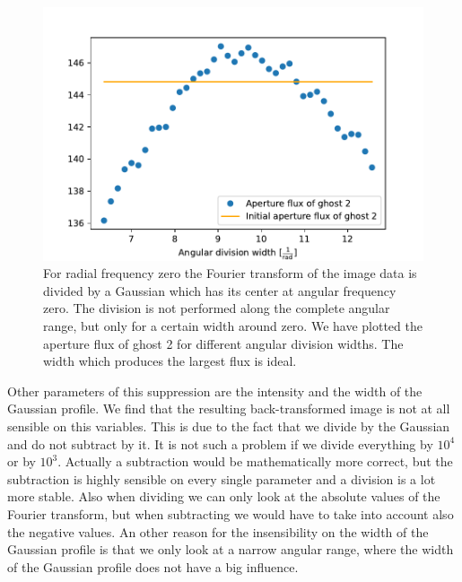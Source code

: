 \begin{figure}[H]
	\centering
		\includegraphics[width=1.0\textwidth]{pics/rad0_diffsubwidths.pdf}
		\caption{For radial frequency zero the Fourier transform of the image data is divided by a Gaussian which has its center at angular frequency zero. The division is not performed along the complete angular range, but only for a certain width around zero. We have plotted the aperture flux of ghost 2 for different angular division widths. The width which produces the largest flux is ideal.}
		\label{fig:rad0_diffsubwidths}
\end{figure}
Other parameters of this suppression are the intensity and the width of the Gaussian profile. We find that the resulting back-transformed image is not at all sensible on this variables. This is due to the fact that we divide by the Gaussian and do not subtract by it. It is not such a problem if we divide everything by $10^4$ or by $10^3$. Actually a subtraction would be mathematically more correct, but the subtraction is highly sensible on every single parameter and a division is a lot more stable. Also when dividing we can only look at the absolute values of the Fourier transform, but when subtracting we would have to take into account also the negative values. An other reason for the insensibility on the width of the Gaussian profile is that we only look at a narrow angular range, where the width of the Gaussian profile does not have a big influence. \\
